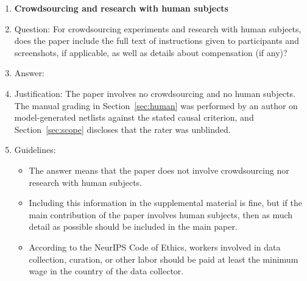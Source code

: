\begin{enumerate}
\item {\bf Crowdsourcing and research with human subjects}
    \item[] Question: For crowdsourcing experiments and research with human subjects, does the paper include the full text of instructions given to participants and screenshots, if applicable, as well as details about compensation (if any)? 
    \item[] Answer: \answerNA{}
    \item[] Justification: The paper involves no crowdsourcing and no human subjects. The manual grading in Section~\ref{sec:human} was performed by an author on model-generated netlists against the stated causal criterion, and Section~\ref{sec:scope} discloses that the rater was unblinded.
    \item[] Guidelines:
    \begin{itemize}
        \item The answer \answerNA{} means that the paper does not involve crowdsourcing nor research with human subjects.
        \item Including this information in the supplemental material is fine, but if the main contribution of the paper involves human subjects, then as much detail as possible should be included in the main paper. 
        \item According to the NeurIPS Code of Ethics, workers involved in data collection, curation, or other labor should be paid at least the minimum wage in the country of the data collector. 
    \end{itemize}


\end{enumerate}
